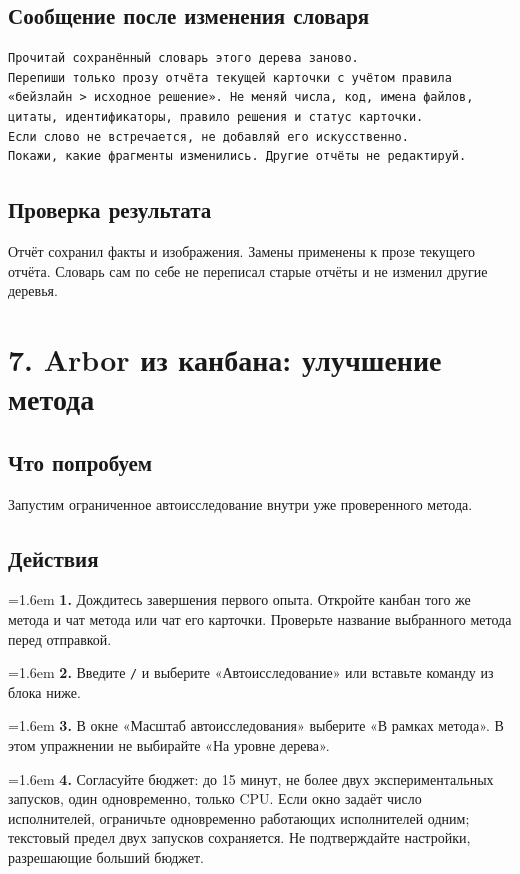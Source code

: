 \documentclass[10pt,a4paper]{article}
\begin{document}
\subsection*{Сообщение после изменения словаря}
\begin{promptbox}
\begin{Verbatim}
Прочитай сохранённый словарь этого дерева заново.
Перепиши только прозу отчёта текущей карточки с учётом правила
«бейзлайн > исходное решение». Не меняй числа, код, имена файлов,
цитаты, идентификаторы, правило решения и статус карточки.
Если слово не встречается, не добавляй его искусственно.
Покажи, какие фрагменты изменились. Другие отчёты не редактируй.
\end{Verbatim}
\end{promptbox}
\subsection*{Проверка результата}
Отчёт сохранил факты и изображения. Замены применены к прозе текущего отчёта. Словарь сам по себе не переписал старые отчёты и не изменил другие деревья.


\clearpage
\section{7. Arbor из канбана: улучшение метода}
\subsection*{Что попробуем}
Запустим ограниченное автоисследование внутри уже проверенного метода.

\subsection*{Действия}
\par\noindent\hangindent=1.6em \textbf{1.} Дождитесь завершения первого опыта. Откройте канбан того же метода и чат метода или чат его карточки. Проверьте название выбранного метода перед отправкой.\par
\par\noindent\hangindent=1.6em \textbf{2.} Введите \texttt{/} и выберите «Автоисследование» или вставьте команду из блока ниже.\par
\par\noindent\hangindent=1.6em \textbf{3.} В окне «Масштаб автоисследования» выберите «В рамках метода». В этом упражнении не выбирайте «На уровне дерева».\par
\par\noindent\hangindent=1.6em \textbf{4.} Согласуйте бюджет: до 15 минут, не более двух экспериментальных запусков, один одновременно, только CPU. Если окно задаёт число исполнителей, ограничьте одновременно работающих исполнителей одним; текстовый предел двух запусков сохраняется. Не подтверждайте настройки, разрешающие больший бюджет.\par
\end{document}

